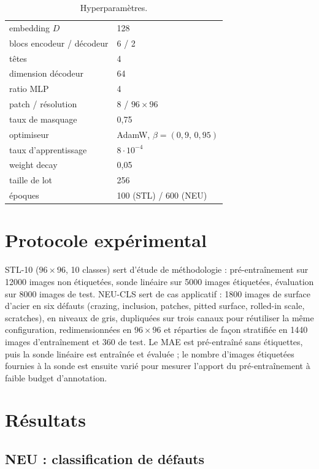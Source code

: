 \documentclass[twocolumn,10pt,a4paper]{article}
\begin{document}
\begin{table}[t]
\centering\small
\begin{tabular}{ll}
\toprule
embedding $D$ & 128 \\
blocs encodeur / décodeur & 6 / 2 \\
têtes & 4 \\
dimension décodeur & 64 \\
ratio MLP & 4 \\
patch / résolution & 8 / $96\times96$ \\
taux de masquage & 0,75 \\
optimiseur & AdamW, $\beta=(0{,}9,\,0{,}95)$ \\
taux d'apprentissage & $8\!\cdot\!10^{-4}$ \\
weight decay & 0,05 \\
taille de lot & 256 \\
époques & 100 (STL) / 600 (NEU) \\
\bottomrule
\end{tabular}
\caption{Hyperparamètres.}
\label{tab:hp}
\end{table}

\section{Protocole expérimental}

STL-10 ($96\times 96$, 10 classes) sert d'étude de méthodologie : pré-entraînement sur 12000 images
non étiquetées, sonde linéaire sur 5000 images étiquetées, évaluation sur 8000 images de test.
NEU-CLS sert de cas applicatif : 1800 images de surface d'acier en six défauts (crazing, inclusion,
patches, pitted surface, rolled-in scale, scratches), en niveaux de gris, dupliquées sur trois
canaux pour réutiliser la même configuration, redimensionnées en $96\times 96$ et réparties de façon
stratifiée en 1440 images d'entraînement et 360 de test. Le MAE est pré-entraîné sans étiquettes,
puis la sonde linéaire est entraînée et évaluée ; le nombre d'images étiquetées fournies à la sonde
est ensuite varié pour mesurer l'apport du pré-entraînement à faible budget d'annotation.

\section{Résultats}

\subsection{NEU : classification de défauts}
\end{document}
